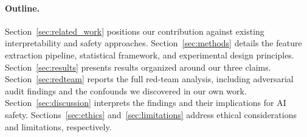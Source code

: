 \paragraph{Outline.}
Section~\ref{sec:related_work} positions our contribution against existing interpretability and safety approaches.
Section~\ref{sec:methods} details the feature extraction pipeline, statistical framework, and experimental design principles.
Section~\ref{sec:results} presents results organized around our three claims.
Section~\ref{sec:redteam} reports the full red-team analysis, including adversarial audit findings and the confounds we discovered in our own work.
Section~\ref{sec:discussion} interprets the findings and their implications for AI safety.
Sections~\ref{sec:ethics} and~\ref{sec:limitations} address ethical considerations and limitations, respectively.
